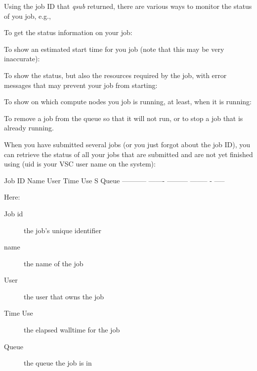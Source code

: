 Using the job ID that \textit{qsub} returned, there are various ways to monitor
the status of you job, e.g.,

To get the status information on your job:

\begin{prompt}
\end{prompt}

To show an estimated start time for you job (note that this may be very inaccurate):

\begin{prompt}
\end{prompt}

To show the status, but also the resources required by the job, with error
messages that may prevent your job from starting:

\begin{prompt}
\end{prompt}

To show on which compute nodes you job is running, at least, when it is
running:

\begin{prompt}
\end{prompt}

To remove a job from the queue so that it will not run, or to stop a job that
is already running.

\begin{prompt}
\end{prompt}

When you have submitted several jobs (or you just forgot about the job ID), you
can retrieve the status of all your jobs that are submitted and are not yet
finished using (uid is your VSC user name on the system):

\begin{prompt}
Job ID      Name    User      Time Use S Queue
----------- ------- --------- -------- - -----
\end{prompt}

Here:
\begin{description}
  \item[Job id] the job's unique identifier
  \item[name] the name of the job
  \item[User] the user that owns the job
  \item[Time Use] the elapsed walltime for the job
  \item[Queue] the queue the job is in
\end{description}

